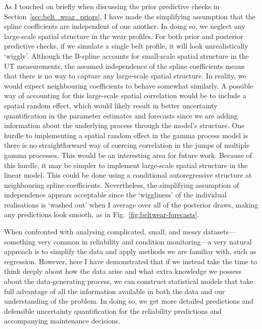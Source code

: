 As I touched on briefly when discussing the prior predictive checks in Section~\ref{sec:belt_wear_priors}, I have made the simplifying assumption that the spline coefficients are independent of one another. In doing so, we neglect any large-scale spatial structure in the wear profiles. For both prior and posterior predictive checks, if we simulate a single belt profile, it will look unrealistically `wiggly'. Although the B-spline accounts for small-scale spatial structure in the UT measurements, the assumed independence of the spline coefficients means that there is no way to capture any large-scale spatial structure. In reality, we would expect neighbouring coefficients to behave somewhat similarly. A possible way of accounting for this large-scale spatial correlation would be to include a spatial random effect, which would likely result in better uncertainty quantification in the parameter estimates and forecasts since we are adding information about the underlying process through the model's structure. One hurdle to implementing a spatial random effect in the gamma process model is there is no straightforward way of coercing correlation in the jumps of multiple gamma processes. This would be an interesting area for future work. Because of this hurdle, it may be simpler to implement large-scale spatial structure in the linear model. This could be done using a conditional autoregressive structure at neighbouring spline coefficients. Nevertheless, the simplifying assumption of independence appears acceptable since the `wiggliness' of the individual realisations is `washed out' when I average over all of the posterior draws, making any predictions look smooth, as in Fig.~\ref{fig:beltwear-forecasts}.

When confronted with analysing complicated, small, and messy datasets---something very common in reliability and condition monitoring---a very natural approach is to simplify the data and apply methods we are familiar with, such as regression. However, here I have demonstrated that if we instead take the time to think deeply about how the data arise and what extra knowledge we possess about the data-generating process, we can construct statistical models that take full advantage of all the information available in both the data and our understanding of the problem. In doing so, we get more detailed predictions and defensible uncertainty quantification for the reliability predictions and accompanying maintenance decisions.